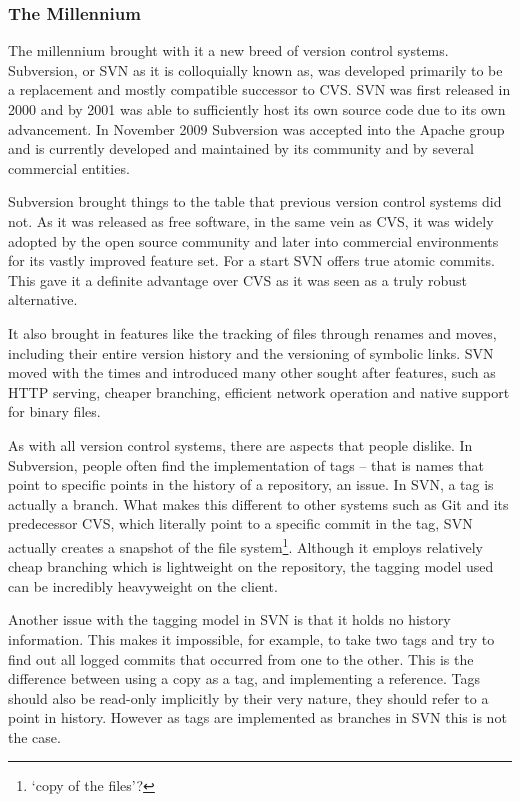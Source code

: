 \subsubsection{The Millennium}
The millennium brought with it a new breed of version control systems.
Subversion, or SVN as it is colloquially known as, was developed primarily to be a replacement and mostly compatible successor to CVS.
SVN was first released in 2000 and by 2001 was able to sufficiently host its own source code due to its own advancement.
In November 2009 Subversion was accepted into the Apache group and is currently developed and maintained by its community and by several commercial entities.

Subversion brought things to the table that previous version control systems did not.
As it was released as free software, in the same vein as CVS, it was widely adopted by the open source community and later into commercial environments for its vastly improved feature set.
For a start SVN offers true atomic commits.
This gave it a definite advantage over CVS as it was seen as a truly robust alternative.

It also brought in features like the tracking of files through renames and moves, including their entire version history and the versioning of symbolic links.
SVN moved with the times and introduced many other sought after features, such as HTTP serving, cheaper branching, efficient network operation and native support for binary files.

As with all version control systems, there are aspects that people dislike.
In Subversion, people often find the implementation of tags -- that is names that point to specific points in the history of a repository, an issue.
In SVN, a tag is actually a branch.
What makes this different to other systems such as Git and its predecessor CVS, which literally point to a specific commit in the tag, SVN actually creates a snapshot of the file system\footnote{`copy of the files'?}.
Although it employs relatively cheap branching which is lightweight on the repository, the tagging model used can be incredibly heavyweight on the client.

Another issue with the tagging model in SVN is that it holds no history information.
This makes it impossible, for example, to take two tags and try to find out all logged commits that occurred from one to the other.
This is the difference between using a copy as a tag, and implementing a reference.
Tags should also be read-only implicitly by their very nature, they should refer to a point in history.
However as tags are implemented as branches in SVN this is not the case.

